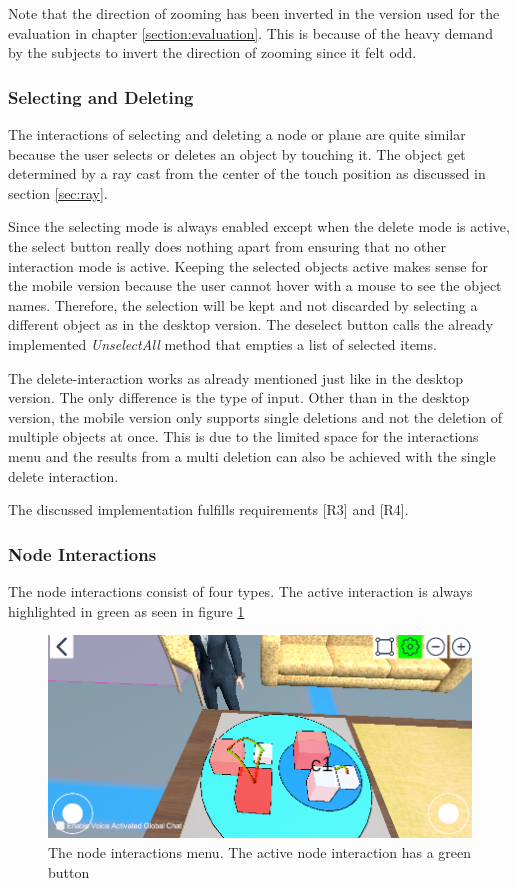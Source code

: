 Note that the direction of zooming has been inverted in the version used for the evaluation in chapter \ref{section:evaluation}.
This is because of the heavy demand by the subjects to invert the direction of zooming since it felt odd.

\subsubsection{Selecting and Deleting}
The interactions of selecting and deleting a \gls{node} or \gls{plane} are quite similar because the user selects or deletes an object by touching it.
The object get determined by a ray cast from the center of the touch position as discussed in section \ref{sec:ray}.

Since the selecting mode is always enabled except when the delete mode is active, the select button really does nothing apart from ensuring that no other interaction mode is active.
Keeping the selected objects active makes sense for the mobile version because the user cannot hover with a mouse to see the object names.
Therefore, the selection will be kept and not discarded by selecting a different object as in the desktop version.
The deselect button calls the already implemented \textit{UnselectAll} method that empties a list of selected items.

The delete-interaction works as already mentioned just like in the desktop version. 
The only difference is the type of input. 
Other than in the desktop version, the mobile version only supports single deletions and not the deletion of multiple objects at once.
This is due to the limited space for the interactions menu and the results from a multi deletion can also be achieved with the single delete interaction.

The discussed implementation fulfills requirements [R3] and [R4].

\subsubsection{Node Interactions}

The \gls{node} interactions consist of four types.
The active interaction is always highlighted in green as seen in figure \ref{fig:node}
\begin{figure}[htb]
    \centering
    \includegraphics[width=1\textwidth]{Implementation/img/node.png}
    \caption{The \gls{node} interactions menu. The active \gls{node} interaction has a green button}\label{fig:node}
\end{figure}

